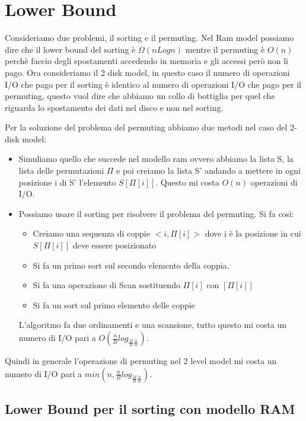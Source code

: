 \documentclass[14pt]{extreport}
\begin{document}
\section{Lower Bound}

Consideriamo due problemi, il sorting e il permuting. 
Nel Ram model possiamo dire che il lower bound del sorting è $\Omega(nLogn)$ mentre il permuting è $O(n)$ perchè faccio degli spostamenti accedendo in memoria e gli accessi però non li pago.
Ora consideriamo il 2 disk model, in questo caso il numero di operazioni I/O che pago per il sorting è identico al numero di operazioni I/O che pago per il permuting, questo vuol dire che abbiamo un collo di bottiglia per quel che riguarda lo spostamento dei dati nel disco e non nel sorting.

Per la soluzione del problema del permuting abbiamo due metodi nel caso del 2-disk model:
\begin{itemize}
    \item Simuliamo quello che succede nel modello ram ovvero abbiamo la lista S, la lista delle permutazioni $\Pi$ e poi creiamo la lista S' andando a mettere in ogni posizione i di S' l'elemento $S[\Pi[i]]$.
    Questo mi costa $O(n)$ operazioni di I/O.
    \item Possiamo usare il sorting per risolvere il problema del permuting. Si fa così:
        \begin{itemize}
            \item Creiamo una sequenza di coppie $<i, \Pi[i]>$ dove i è la posizione in cui $S[\Pi[i]]$ deve essere posizionato
            \item Si fa un primo sort sul secondo elemento della coppia.
            \item Si fa una operazione di Scan sostituendo $\Pi[i]$ con $[\Pi[i]]$
            \item Si fa un sort sul primo elemento delle coppie
        \end{itemize}
    L'algoritmo fa due ordinamenti e una scansione, tutto questo mi costa un numero di I/O pari a $O(\frac{n}{B}log_{\frac{M}{B}\frac{n}{m}})$.
    
\end{itemize}
Quindi in generale l'operazione di permuting nel 2 level model mi costa un numero di I/O pari a $min(n,\frac{n}{B}log_{\frac{M}{B}\frac{n}{m}})$.


\subsection{Lower Bound per il sorting con modello RAM}
\end{document}
